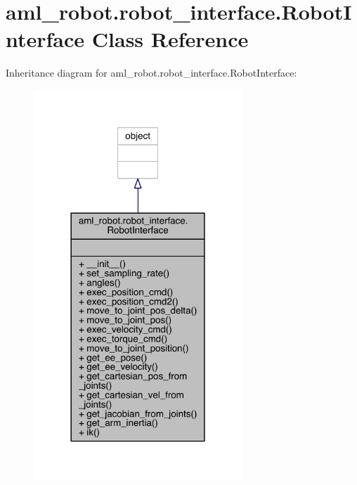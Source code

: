 \hypertarget{classaml__robot_1_1robot__interface_1_1_robot_interface}{}\section{aml\+\_\+robot.\+robot\+\_\+interface.\+Robot\+Interface Class Reference}
\label{classaml__robot_1_1robot__interface_1_1_robot_interface}


Inheritance diagram for aml\+\_\+robot.\+robot\+\_\+interface.\+Robot\+Interface\+:
\nopagebreak
\begin{figure}[H]
\begin{center}
\leavevmode
\includegraphics[width=222pt]{classaml__robot_1_1robot__interface_1_1_robot_interface__inherit__graph}
\end{center}
\end{figure}


